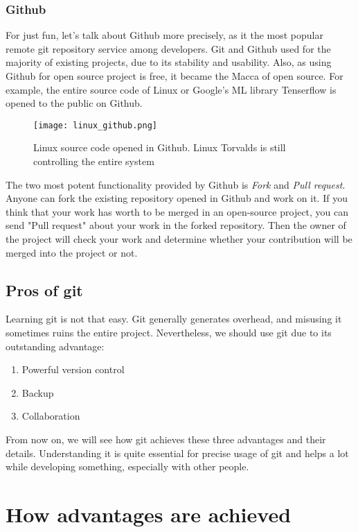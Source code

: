 \documentclass{oblivoir}
\begin{document}
\subsubsection{Github}

For just fun, let's talk about Github more precisely, as it the most popular remote git repository service among developers. Git and Github used for the majority of existing projects, due to its stability and usability. Also, as using Github for open source project is free, it became the Macca of open source. For example, the entire source code of Linux or Google's ML library Tenserflow is opened to the public on Github. 

\begin{figure}[h]
    \centering
    \texttt{[image: linux\_github.png]}
    \caption{Linux source code opened in Github. Linux Torvalds is still controlling the entire system}
    \label{fig:my_label}
\end{figure}

The two most potent functionality provided by Github is \textit{Fork} and \textit{Pull request}. Anyone can fork the existing repository opened in Github and work on it. If you think that your work has worth to be merged in an open-source project, you can send "Pull request" about your work in the forked repository. Then the owner of the project will check your work and determine whether your contribution will be merged into the project or not. 

\subsection{Pros of git}

Learning git is not that easy. Git generally generates overhead, and misusing it sometimes ruins the entire project. Nevertheless, we should use git due to its outstanding advantage: 

\begin{enumerate}
    \item Powerful version control
    \item Backup
    \item Collaboration
\end{enumerate}


From now on, we will see how git achieves these three advantages and their details. Understanding it is quite essential for precise usage of git and helps a lot while developing something, especially with other people.

\section{How advantages are achieved}
\end{document}
